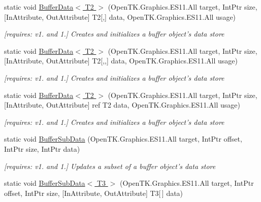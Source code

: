 \begin{DoxyCompactItemize}
static void \hyperlink{class_open_t_k_1_1_graphics_1_1_e_s11_1_1_g_l_aa6caccb92d149948e0f08c55e8eb9724}{Buffer\-Data$<$ T2 $>$} (Open\-T\-K.\-Graphics.\-E\-S11.\-All target, Int\-Ptr size, \mbox{[}In\-Attribute, Out\-Attribute\mbox{]} T2\mbox{[},\mbox{]} data, Open\-T\-K.\-Graphics.\-E\-S11.\-All usage)
\begin{DoxyCompactList}\small\item\em \mbox{[}requires\-: v1. and 1.\mbox{]} Creates and initializes a buffer object's data store \end{DoxyCompactList}\item 
static void \hyperlink{class_open_t_k_1_1_graphics_1_1_e_s11_1_1_g_l_a302a6bf758be9daed87b3f4bca087841}{Buffer\-Data$<$ T2 $>$} (Open\-T\-K.\-Graphics.\-E\-S11.\-All target, Int\-Ptr size, \mbox{[}In\-Attribute, Out\-Attribute\mbox{]} T2\mbox{[},,\mbox{]} data, Open\-T\-K.\-Graphics.\-E\-S11.\-All usage)
\begin{DoxyCompactList}\small\item\em \mbox{[}requires\-: v1. and 1.\mbox{]} Creates and initializes a buffer object's data store \end{DoxyCompactList}\item 
static void \hyperlink{class_open_t_k_1_1_graphics_1_1_e_s11_1_1_g_l_abadd505d7dfdb3cd015e4a0cbd4786c6}{Buffer\-Data$<$ T2 $>$} (Open\-T\-K.\-Graphics.\-E\-S11.\-All target, Int\-Ptr size, \mbox{[}In\-Attribute, Out\-Attribute\mbox{]} ref T2 data, Open\-T\-K.\-Graphics.\-E\-S11.\-All usage)
\begin{DoxyCompactList}\small\item\em \mbox{[}requires\-: v1. and 1.\mbox{]} Creates and initializes a buffer object's data store \end{DoxyCompactList}\item 
static void \hyperlink{class_open_t_k_1_1_graphics_1_1_e_s11_1_1_g_l_ab68ae06b1f362135b81ecfbf1e1c32da}{Buffer\-Sub\-Data} (Open\-T\-K.\-Graphics.\-E\-S11.\-All target, Int\-Ptr offset, Int\-Ptr size, Int\-Ptr data)
\begin{DoxyCompactList}\small\item\em \mbox{[}requires\-: v1. and 1.\mbox{]} Updates a subset of a buffer object's data store \end{DoxyCompactList}\item 
static void \hyperlink{class_open_t_k_1_1_graphics_1_1_e_s11_1_1_g_l_a7c2db62f766e71c7c52a3f3a9b2d34ae}{Buffer\-Sub\-Data$<$ T3 $>$} (Open\-T\-K.\-Graphics.\-E\-S11.\-All target, Int\-Ptr offset, Int\-Ptr size, \mbox{[}In\-Attribute, Out\-Attribute\mbox{]} T3\mbox{[}$\,$\mbox{]} data)

\end{DoxyCompactItemize}
